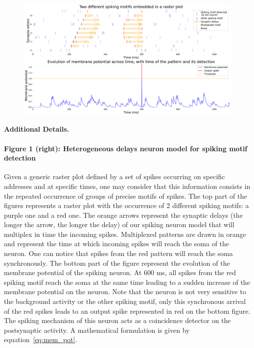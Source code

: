 \documentclass[11pt]{article}
\begin{document}
\begin{figure}
\vspace{-15pt}
\includegraphics[width=0.99\linewidth]{heterogeneous_neuron.pdf}
\vspace{-25pt}
\end{figure}

\textbf{Additional Details.}%
%
%
\paragraph*{Figure 1 (right): Heterogeneous delays neuron model for spiking motif detection}

Given a generic raster plot defined by a set of spikes occurring on specific addresses and at specific times, one may consider that this information consists in the repeated occurrence of groups of precise motifs of spikes. The top part of the figures represents a raster plot with the occurrence of 2 different spiking motifs: a purple one and a red one. The orange arrows represent the synaptic delays (the longer the arrow, the longer the delay) of our spiking neuron model that will multiplex in time the incoming spikes. Multiplexed patterns are drawn in orange and represent the time at which incoming spikes will reach the soma of the neuron. One can notice that spikes from the red pattern will reach the soma synchronously. The bottom part of the figure represent the evolution of the membrane potential of the spiking neuron. At 600 ms, all spikes from the red spiking motif reach the soma at the same time leading to a sudden increase of the membrane potential on the neuron. Note that the neuron is not very sensitive to the background activity or the other spiking motif, only this synchronous arrival of the red spikes leads to an output spike represented in red on the bottom figure. The spiking mechanism of this neuron acts as a coincidence detector on the postsynaptic activity. A mathematical formulation is given by equation~\eqref{eq:mem_pot}. 
\end{document}
